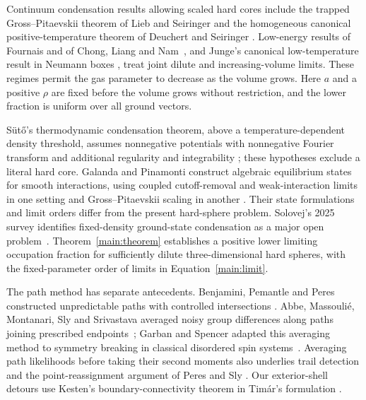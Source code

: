 Continuum condensation results allowing scaled hard cores include the
trapped Gross--Pitaevskii theorem of Lieb and Seiringer
\cite{LiebSeiringer2002} and the homogeneous canonical
positive-temperature theorem of Deuchert and Seiringer
\cite{DeuchertSeiringer2020GP}. Low-energy results of Fournais and of
Chong, Liang and Nam~\cite{Fournais2021,ChongLiangNam2026}, and Junge's
canonical low-temperature result in Neumann boxes
\cite[Corollary~6]{Junge2026}, treat joint dilute and increasing-volume
limits. These regimes permit the gas parameter to decrease as the volume
grows. Here $a$ and a positive $\rho$ are fixed before the volume grows
without restriction, and the lower fraction is uniform over all ground
vectors.

S\"ut\H{o}'s thermodynamic condensation theorem, above a temperature-dependent
density threshold, assumes nonnegative potentials with nonnegative Fourier
transform and additional regularity and integrability
\cite[Theorem~1.2]{Suto2023TwoStep}; these hypotheses exclude a literal hard
core. Galanda and Pinamonti construct algebraic equilibrium states for smooth
interactions, using coupled cutoff-removal and weak-interaction limits in
one setting and Gross--Pitaevskii scaling in another
\cite{GalandaPinamonti2025Equilibrium,GalandaPinamonti2026GP}. Their state
formulations and limit orders differ from the present hard-sphere problem.
Solovej's 2025 survey identifies fixed-density ground-state condensation
as a major open problem~\cite[Section~5]{Solovej2025}.
Theorem~\ref{main:theorem} establishes a positive lower limiting occupation
fraction for sufficiently dilute three-dimensional hard spheres, with the
fixed-parameter order of limits in Equation~\eqref{main:limit}.

The path method has separate antecedents. Benjamini, Pemantle and Peres
constructed unpredictable paths with controlled intersections
\cite[Theorem~1.3 and Lemma~3.1]{BPP1998}. Abbe, Massouli\'e, Montanari, Sly and
Srivastava averaged noisy group differences along paths joining prescribed
endpoints~\cite{AbbeMassoulieMontanariSlySrivastava2018}; Garban and Spencer
adapted this averaging method to symmetry breaking in classical disordered
spin systems~\cite{GarbanSpencer2023}. Averaging path likelihoods before
taking their second moments also underlies trail detection
\cite{AriasCastroCandesHelgasonZeitouni2008,BergerPeres2013} and the
point-reassignment argument of Peres and Sly
\cite[Proposition~2.1]{PeresSly2014}. Our exterior-shell detours use Kesten's
boundary-connectivity theorem in Tim\'ar's formulation
\cite[arXiv version~2, Theorem~4]{Timar2013}.

